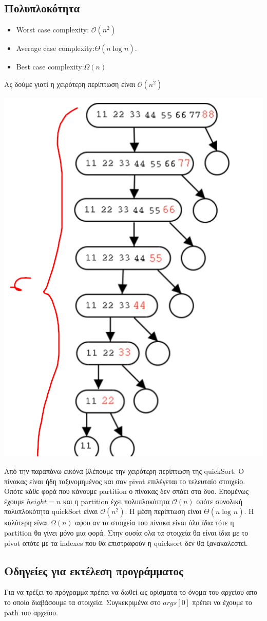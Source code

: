 \documentclass[12pt]{article}
\begin{document}
  \subsection{Πολυπλοκότητα}
  \begin{itemize}
  \item Worst case complexity: $\mathcal{O}(n^2)$
  \item Average case complexity:$\Theta(n\log_{}n)$.
  \item Best case complexity:$\Omega(n)$
  \end{itemize}
  
  Ας δούμε γιατί η χειρότερη περίπτωση είναι  $\mathcal{O}(n^2)$
  \begin{center}
     \includegraphics[scale = 0.7]{quick_image.png}
  \end{center}
   Από την παραπάνω εικόνα βλέπουμε την χειρότερη περίπτωση της quickSort. Ο πίνακας είναι ήδη ταξινομημένος και σαν pivot επιλέγεται το τελευταίο στοιχείο. Οπότε κάθε φορά που κάνουμε partition ο πίνακας δεν σπάει στα δυο. Επομένως έχουμε $height = n$ και η partition έχει πολυπλοκότητα $\mathcal{O}(n)$ οπότε συνολική πολυπλοκότητα quickSort είναι  $\mathcal{O}(n^2)$. Η μέση  περίπτωση είναι $\Theta(n\log_{}n)$. Η καλύτερη είναι $\Omega(n)$
   αφου αν τα στοιχεία του πίνακα είναι όλα ίδια τότε η partition θα γίνει μόνο μια φορά. Στην ουσία ολα τα στοιχεία θα είναι ίδια με το pivot οπότε με τα indexes που θα επιστραφούν η quicksort δεν θα ξανακαλεστεί.
  

  
  \subsection{Οδηγείες για εκτέλεση προγράμματος}
   Για να τρέξει το πρόγραμμα πρέπει να δωθεί ως ορίσματα το όνομα του αρχείου απο το οποίο διαβάσουμε τα στοιχεία.  Συγκεκριμένα στο $args[0]$ πρέπει να έχουμε το path του αρχείου. 
	
\end{document}
